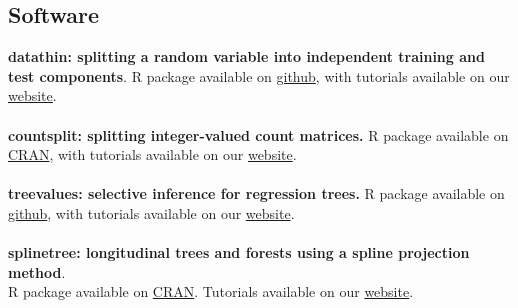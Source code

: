 \documentclass[margin, 10pt]{res}
\begin{document}
\begin{resume}
\section{Software} 
\textbf{datathin: splitting a random variable into independent training and test components}. R package available on \href{https://github.com/anna-neufeld/datathin}{github}, with tutorials available on our \href{https://anna-neufeld.github.io/datathin/}{website}.  \\
\\
\textbf{countsplit: splitting integer-valued count matrices.} R package available on \href{https://cran.r-project.org/web/packages/countsplit/index.html}{CRAN}, with tutorials available on our \href{https://anna-neufeld.github.io/countsplit.tutorials/}{website}. \\
\\
\textbf{treevalues: selective inference for regression trees.} R package available on \href{https://github.com/anna-neufeld/treevalues}{github}, with tutorials available on our \href{https://anna-neufeld.github.io/treevalues/}{website}. \\
\\
\textbf{splinetree: longitudinal trees and forests using a spline projection method}. \\
R package available on \href{https://cran.r-project.org/web/packages/splinetree/index.html}{CRAN}. Tutorials available on our \href{https://anna-neufeld.github.io/splinetree/}{website}. 



\end{resume}
\end{document}
